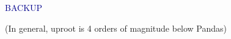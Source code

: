 \documentclass[aspectratio=169]{beamer}
\begin{document}
\begin{frame}{}
\huge
\vspace{1 cm}
\begin{center}
\textcolor{darkblue}{BACKUP}
\end{center}
\end{frame}

\begin{frame}{(In general, uproot is 4 orders of magnitude below Pandas)}
\vspace{0.5 cm}
\begin{columns}
\end{columns}
\end{frame}
\end{document}
